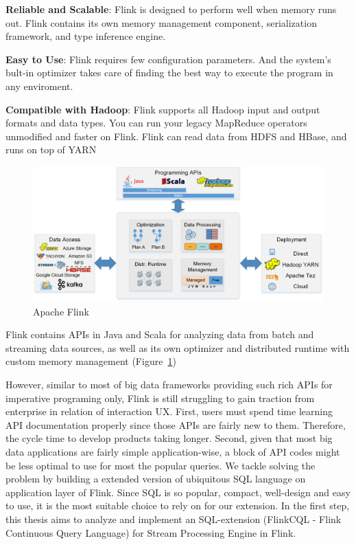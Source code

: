 \textbf{Reliable and Scalable}: Flink is designed to perform well when memory runs out.  Flink contains its own memory management component, serialization framework, and type inference engine.

\textbf{Easy to Use}: Flink requires few configuration parameters. And the system's bult-in optimizer takes care of finding the best way to execute the program in any enviroment.

\textbf{Compatible with Hadoop}: Flink supports all Hadoop input and output formats and data types. You can run your legacy MapReduce operators unmodified and faster on Flink. Flink can read data from HDFS and HBase, and runs on top of YARN

\begin{figure}[htbp!] 
\centering    
\includegraphics[width=1\textwidth]{ApacheFlink}
\caption{Apache Flink}
\label{fig:flink}
\end{figure}


Flink contains APIs in Java and Scala for analyzing data from batch and streaming data sources, as well as its own optimizer and distributed runtime with custom memory management (Figure~\ref{fig:flink})

However, similar to most of big data frameworks providing such rich APIs for imperative programing only, Flink is still struggling to gain traction from enterprise in relation of interaction UX.  First, users must spend time learning API documentation properly since those APIs are fairly new to them. Therefore, the cycle time to develop products taking longer. Second, given that most big data applications are fairly simple application-wise, a block of API codes might be less optimal to use for most the popular queries. We tackle solving the problem by building a extended version of ubiquitous SQL language on application layer of Flink. Since SQL is so popular, compact, well-design and easy to use, it is the most suitable choice to rely on for our extension. In the first step, this thesis aims to analyze and implement an SQL-extension (FlinkCQL - Flink Continuous Query Language) for Stream Processing Engine in Flink.

